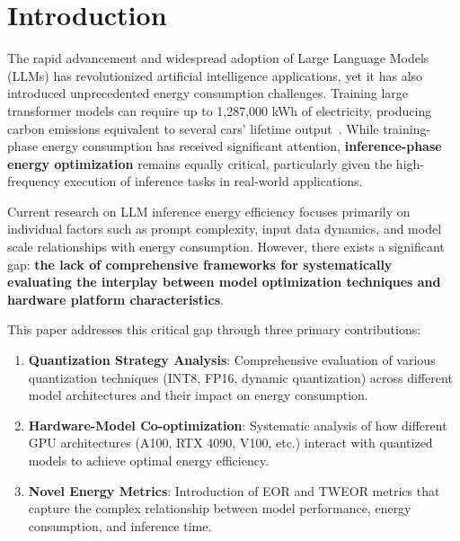 \documentclass[sigconf]{acmart}
\begin{document}
\maketitle

\section{Introduction}

The rapid advancement and widespread adoption of Large Language Models (LLMs) has revolutionized artificial intelligence applications, yet it has also introduced unprecedented energy consumption challenges. Training large transformer models can require up to 1,287,000 kWh of electricity, producing carbon emissions equivalent to several cars' lifetime output~\cite{strubell2019energy}. While training-phase energy consumption has received significant attention, \textbf{inference-phase energy optimization} remains equally critical, particularly given the high-frequency execution of inference tasks in real-world applications.

Current research on LLM inference energy efficiency focuses primarily on individual factors such as prompt complexity, input data dynamics, and model scale relationships with energy consumption. However, there exists a significant gap: \textbf{the lack of comprehensive frameworks for systematically evaluating the interplay between model optimization techniques and hardware platform characteristics}.

This paper addresses this critical gap through three primary contributions:

\begin{enumerate}
\item \textbf{Quantization Strategy Analysis}: Comprehensive evaluation of various quantization techniques (INT8, FP16, dynamic quantization) across different model architectures and their impact on energy consumption.

\item \textbf{Hardware-Model Co-optimization}: Systematic analysis of how different GPU architectures (A100, RTX 4090, V100, etc.) interact with quantized models to achieve optimal energy efficiency.

\item \textbf{Novel Energy Metrics}: Introduction of EOR and TWEOR metrics that capture the complex relationship between model performance, energy consumption, and inference time.
\end{enumerate}
\end{document}
